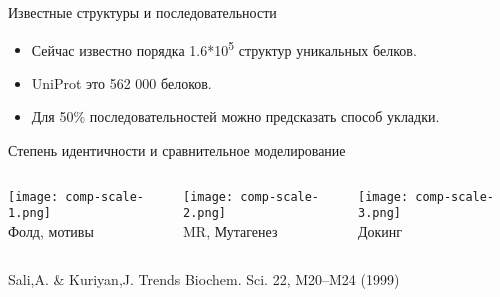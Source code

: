 \begin{frame}
{Известные структуры и последовательности}{}
 \begin{itemize}
  \item
	  Сейчас известно порядка 1.6*10\textsuperscript{5} структур уникальных белков. 
\vspace{0.2cm}
  \item
	  UniProt это 562 000 белоков.
\vspace{0.2cm}
  \item
	  Для 50\% последовательностей можно предсказать способ укладки.
  \end{itemize}
\end{frame}


\begin{frame}{Степень идентичности и сравнительное моделирование}{}
    \centering
{}
        \begin{columns}
                \begin{column}{0.3\textwidth}
    \centering
                        \texttt{[image: comp-scale-1.png]} \\
            Фолд, мотивы
                \end{column}
                \begin{column}{0.3\textwidth}
    \centering
                        \texttt{[image: comp-scale-2.png]} \\
            MR, Мутагенез
                \end{column}
                \begin{column}{0.3\textwidth}
    \centering
                        \texttt{[image: comp-scale-3.png]} \\
            Докинг
                \end{column}
        \end{columns}
    \vspace{1cm}
                        \footnotesize{Sali,A. \& Kuriyan,J. Trends Biochem. Sci. 22, M20–M24 (1999)}
\end{frame}


